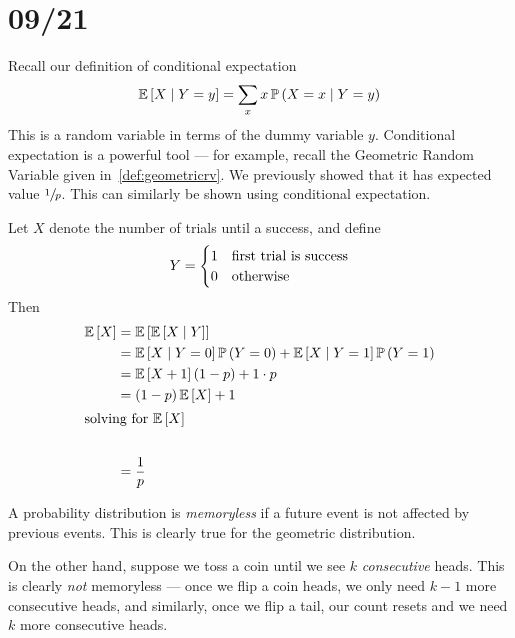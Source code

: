 \section{09/21}
Recall our definition of conditional expectation
\[\operatorname{\mathbb{E}}\left[X \mid Y = y\right] = \sum_{x} x \operatorname{\mathbb{P}}\left(X = x \mid Y = y\right)\]
This is a random variable in terms of the dummy variable $y$. Conditional
expectation is a powerful tool --- for example, recall the Geometric Random
Variable given in~\cref{def:geometricrv}. We previously showed that it has
expected value $\sfrac{1}{p}$. This can similarly be shown using conditional
expectation.

Let $X$ denote the number of trials until a success, and define
\[Y = \begin{cases}1 & \hbox{first trial is success}\\
                   0 & \hbox{otherwise}\end{cases}\]
Then
\begin{align*}\operatorname{\mathbb{E}}\left[X\right]
    &= \operatorname{\mathbb{E}}\left[\operatorname{\mathbb{E}}\left[X \mid Y\right]\right]\\
    &= \operatorname{\mathbb{E}}\left[X \mid Y = 0\right]\operatorname{\mathbb{P}}\left(Y = 0\right) + \operatorname{\mathbb{E}}\left[X \mid Y = 1\right]\operatorname{\mathbb{P}}\left(Y = 1\right)\\
    &= \operatorname{\mathbb{E}}\left[X + 1\right](1 - p) + 1 \cdot p\\
    &= (1 - p)\operatorname{\mathbb{E}}\left[X\right] + 1\\
    \shortintertext{solving for $\operatorname{\mathbb{E}}\left[X\right]$}\\
    &= \frac{1}{p}
\end{align*}

A probability distribution is \emph{memoryless} if a future event is not
affected by previous events. This is clearly true for the geometric
distribution. 

On the other hand, suppose we toss a coin until we see $k$ \emph{consecutive}
heads. This is clearly \emph{not} memoryless --- once we flip a coin heads, we
only need $k - 1$ more consecutive heads, and similarly, once we flip a tail,
our count resets and we need $k$ more consecutive heads.

